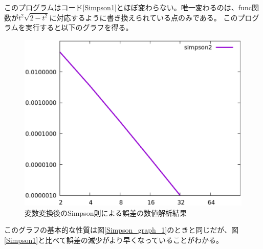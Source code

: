 \documentclass[a4paper]{jsarticle}
\begin{document}
このプログラムはコード\ref{Simpson1}とほぼ変わらない。唯一変わるのは、func関数が\(t^2\sqrt{2-t^2}\)に対応するように書き換えられている点のみである。
このプログラムを実行すると以下のグラフを得る。
\begin{figure}[H]
  \includegraphics[width=\textwidth]{pictures/simpson2.eps}
  \caption{変数変換後のSimpson則による誤差の数値解析結果}
  \label{simpson_graph_2}
\end{figure}

このグラフの基本的な性質は図\ref{Simpson_graph_1}のときと同じだが、図\ref{Simpson1}と比べて誤差の減少がより早くなっていることがわかる。
\end{document}
